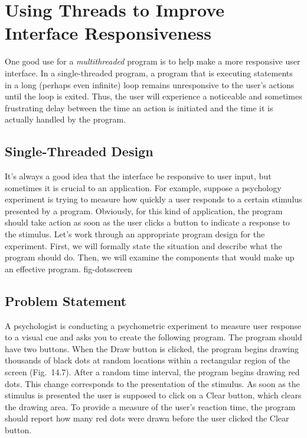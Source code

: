 \section{Using Threads to Improve \\\hspace*{2.8pc}Interface Responsiveness}
\label{using-threadsto-improvehspace-interface-responsiveness}
\noindent One good use for a {\it multithreaded} program is to help
make a more responsive user interface.  In a single-threaded program,
a program that is executing statements in a long (perhaps even
infinite) loop remains unresponsive to the user's actions until the
loop is exited.  Thus, the user will experience a noticeable and
sometimes frustrating delay between the time an action is initiated
and the time it is actually handled by the program.

\subsection{Single-Threaded Design}
\noindent It's always a good idea that the interface be responsive to
user input, but sometimes it is crucial to an application.  For
example, suppose a psychology experiment is trying to measure how
quickly a user responds to a certain stimulus presented by a program.
Obviously, for this kind of application, the program should take
action as soon as the user clicks a button to indicate a response to
the stimulus. Let's work through an appropriate program design for
the experiment. First, we will formally state the situation and
describe what the program should do.  Then, we will examine the
components that would make up an effective program.
{fig-dotsscreen}


\subsection*{Problem Statement}
\noindent A psychologist is conducting a psychometric experiment to measure user
response to a visual cue and asks you to create the following
program.  The program should have two buttons.  When the Draw button
is clicked, the program begins drawing thousands of black dots at
random locations within a rectangular region of the screen
(Fig.~14.7).  After a random time interval, the
program begins drawing red dots.  This change corresponds to the
presentation of the stimulus.  As soon as the stimulus is presented
the user is supposed to click on a Clear button, which clears the
drawing area.  To provide a measure of the user's reaction time, the
program should report how many red dots were drawn before the user
clicked the Clear button.

